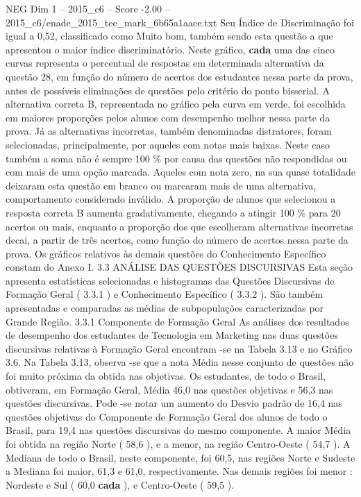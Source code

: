 \begin{textsample}{NEG Dim 1 – 2015\_c6 – Score -2.00 – 2015\_c6/enade\_2015\_tec\_mark\_6b65a1aace.txt}
Seu Índice de Discriminação foi igual a 0,52, classificado como Muito bom, também sendo esta questão a que apresentou o maior índice discriminatório.
Neste gráfico, \textbf{cada} uma das cinco curvas representa o percentual de respostas em determinada alternativa da questão 28, em função do número de acertos dos estudantes nessa parte da prova, antes de possíveis eliminações de questões pelo critério do ponto bisserial.
A alternativa correta B, representada no gráfico pela curva em verde, foi escolhida em maiores proporções pelos alunos com desempenho melhor nessa parte da prova.
Já as alternativas incorretas, também denominadas distratores, foram selecionadas, principalmente, por aqueles com notas mais baixas.
Neste caso também a soma não é sempre 100 \% por causa das questões não respondidas ou com mais de uma opção marcada.
Aqueles com nota zero, na sua quase totalidade deixaram esta questão em branco ou marcaram mais de uma alternativa, comportamento considerado inválido.
A proporção de alunos que selecionou a resposta correta B aumenta gradativamente, chegando a atingir 100 \% para 20 acertos ou mais, enquanto a proporção dos que escolheram alternativas incorretas decai, a partir de três acertos, como função do número de acertos nessa parte da prova.
Os gráficos relativos às demais questões do Conhecimento Específico constam do Anexo I. 3.3 ANÁLISE DAS QUESTÕES DISCURSIVAS Esta seção apresenta estatísticas selecionadas e histogramas das Questões Discursivas de Formação Geral ( 3.3.1 ) e Conhecimento Específico ( 3.3.2 ).
São também apresentadas e comparadas as médias de subpopulações caracterizadas por Grande Região. 3.3.1 Componente de Formação Geral As análises dos resultados de desempenho dos estudantes de Tecnologia em Marketing nas duas questões discursivas relativas à Formação Geral encontram -se na Tabela 3.13 e no Gráfico 3.6.
Na Tabela 3.13, observa -se que a nota Média nesse conjunto de questões não foi muito próxima da obtida nas objetivas.
Os estudantes, de todo o Brasil, obtiveram, em Formação Geral, Média 46,0 nas questões objetivas e 56,3 nas questões discursivas.
Pode -se notar um aumento do Desvio padrão de 16,4 nas questões objetivas do Componente de Formação Geral dos alunos de todo o Brasil, para 19,4 nas questões discursivas do mesmo componente.
A maior Média foi obtida na região Norte ( 58,6 ), e a menor, na região Centro-Oeste ( 54,7 ).
A Mediana de todo o Brasil, neste componente, foi 60,5, nas regiões Norte e Sudeste a Mediana foi maior, 61,3 e 61,0, respectivamente.
Nas demais regiões foi menor : Nordeste e Sul ( 60,0 \textbf{cada} ), e Centro-Oeste ( 59,5 ).

\end{textsample}

